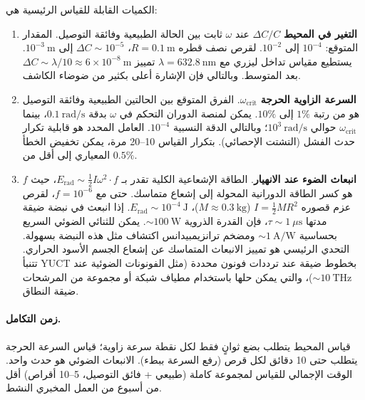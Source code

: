 \documentclass[12pt,a4paper]{article}
\begin{document}
	الكميات القابلة للقياس الرئيسية هي:
	\begin{enumerate}
		\item \textbf{التغير في المحيط} \(\Delta C/C\) عند \(\omega\) ثابت بين الحالة الطبيعية وفائقة التوصيل. المقدار المتوقع: \(10^{-4}\) إلى \(10^{-2}\). لقرص نصف قطره \(R = 0.1\ \text{m}\)، \(\Delta C \sim 10^{-5}\) إلى \(10^{-3}\ \text{m}\). يستطيع مقياس تداخل ليزري مع \(\lambda = 632.8\ \text{nm}\) تمييز \(\Delta C \sim \lambda/10 \approx 6\times10^{-8}\ \text{m}\) بعد المتوسط. وبالتالي فإن الإشارة أعلى بكثير من ضوضاء الكاشف.
		
		\item \textbf{السرعة الزاوية الحرجة} \(\omega_{\text{crit}}\). الفرق المتوقع بين الحالتين الطبيعية وفائقة التوصيل هو من رتبة \(1\%\) إلى \(10\%\). يمكن لمنصة الدوران التحكم في \(\omega\) بدقة \(0.1\ \text{rad/s}\)، بينما \(\omega_{\text{crit}}\) حوالي \(10^3\ \text{rad/s}\)؛ وبالتالي الدقة النسبية \(10^{-4}\). العامل المحدد هو قابلية تكرار حدث الفشل (التشتت الإحصائي). بتكرار القياس 10–20 مرة، يمكن تخفيض الخطأ المعياري إلى أقل من \(0.5\%\).
		
		\item \textbf{انبعاث الضوء عند الانهيار}. الطاقة الإشعاعية الكلية تقدر بـ \(E_{\text{rad}} \sim \frac{1}{2} I \omega^2 \cdot f\)، حيث \(f\) هو كسر الطاقة الدورانية المحولة إلى إشعاع متماسك. حتى مع \(f = 10^{-6}\)، لقرص عزم قصوره \(I = \frac{1}{2} M R^2\) (\(M \approx 0.3\ \text{kg}\))، \(E_{\text{rad}} \sim 10^{-4}\ \text{J}\). إذا انبعث في نبضة ضيقة مدتها \(\tau \sim 1\ \mu\text{s}\)، فإن القدرة الذروية \(\sim 100\ \text{W}\). يمكن للثنائي الضوئي السريع بحساسية \(\sim 1\ \text{A/W}\) ومضخم ترانزيمبيدانس اكتشاف مثل هذه النبضة بسهولة. التحدي الرئيسي هو تمييز الانبعاث المتماسك عن إشعاع الجسم الأسود الحراري. تتنبأ YUCT بخطوط ضيقة عند ترددات فونون محددة (مثل الفونونات الضوئية عند \(\sim 10\ \text{THz}\))، والتي يمكن حلها باستخدام مطياف شبكة أو مجموعة من المرشحات ضيقة النطاق.
	\end{enumerate}
	
	\paragraph{زمن التكامل.}
	قياس المحيط يتطلب بضع ثوانٍ فقط لكل نقطة سرعة زاوية؛ قياس السرعة الحرجة يتطلب حتى 10 دقائق لكل قرص (رفع السرعة ببطء). الانبعاث الضوئي هو حدث واحد. الوقت الإجمالي للقياس لمجموعة كاملة (طبيعي + فائق التوصيل، 5–10 أقراص) أقل من أسبوع من العمل المخبري النشط.
	
\end{document}

